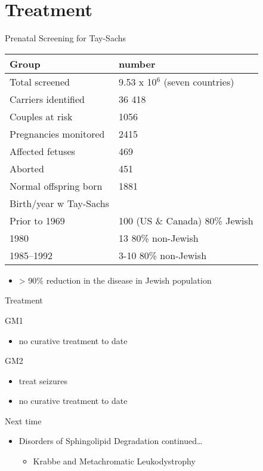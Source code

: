 \documentclass[presentation, smaller]{beamer}
\begin{document}
\section{Treatment}
\label{sec:orgheadline22}
\begin{frame}[label={sec:orgheadline19}]{Prenatal Screening for Tay-Sachs}
\begin{center}
\begin{tabular}{ll}
Group & number\\
\hline
Total screened & 9.53 x 10\(^{\text{6}}\) (seven countries)\\
Carriers identified & 36 418\\
Couples at risk & 1056\\
Pregnancies monitored & 2415 \footnotemark[2]{}\\
Affected fetuses & 469\\
Aborted & 451\\
Normal offspring born & 1881\\
Birth/year w Tay-Sachs & \\
Prior to 1969 & 100 (US \& Canada) 80\% Jewish\\
1980 & 13 80\% non-Jewish\\
1985–1992 & 3-10 80\% non-Jewish\\
\end{tabular}
\end{center}

\begin{itemize}
\item > 90\% reduction in the disease in Jewish population
\end{itemize}
\end{frame}

\begin{frame}[label={sec:orgheadline20}]{Treatment}
\begin{block}{GM1}
\begin{itemize}
\item no curative treatment to date
\end{itemize}
\end{block}
\begin{block}{GM2}
\begin{itemize}
\item treat seizures
\item no curative treatment to date
\end{itemize}
\end{block}
\end{frame}
\begin{frame}[label={sec:orgheadline21}]{Next time}
\begin{itemize}
\item Disorders of Sphingolipid Degradation continued\ldots{}
\begin{itemize}
\item Krabbe and Metachromatic Leukodystrophy
\end{itemize}
\end{itemize}
\end{frame}
\end{document}
